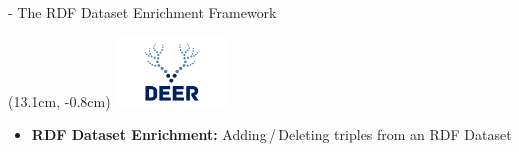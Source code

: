 \documentclass[aspectratio=1610]{beamer}
\def\<#1>{{\textsmaller{#1}}}
\begin{document}
\begin{frame}{\<DEER> - The RDF Dataset Enrichment Framework}
\begin{textblock*}{3cm}(13.1cm, -0.8cm) %
\includegraphics[width=3cm]{gfx/deer}
\end{textblock*}
\begin{itemize}
  \item<1-> \textbf{RDF Dataset Enrichment:} Adding\,/\,Deleting triples from an RDF Dataset
\end{itemize}
\end{frame}
\end{document}
